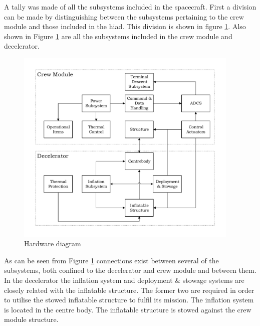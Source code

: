 A tally was made of all the subsystems included in the spacecraft. First a division can be made by distinguishing between the subsystems pertaining to the crew module and those included in the \gls{hiad}. This division is shown in figure \ref{fig:subsystems}. Also shown in Figure \ref{fig:subsystems} are all the subsystems included in the crew module and decelerator.
\begin{figure}[h]
	\includegraphics[width=0.95\textwidth]{./Figure/subsystem_breakdown/hardware_structure.pdf}
	\caption{Hardware diagram}
	\label{fig:subsystems} 
\end{figure}
%
%
%
%
%
%

As can be seen from Figure \ref{fig:subsystems} connections exist between several of the subsystems, both confined to the decelerator and crew module and between them. In the decelerator the inflation system and deployment \& stowage systems are closely related with the inflatable structure. The former two are required in order to utilise the stowed inflatable structure to fulfil its mission. The inflation system is located in the centre body. The inflatable structure is stowed against the crew module structure.

